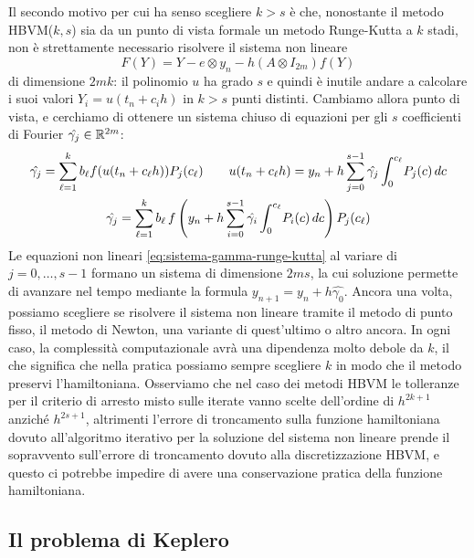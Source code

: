 Il secondo motivo per cui ha senso scegliere $k > s$ è che, nonostante
il metodo HBVM($k,s$) sia da un punto di vista formale un metodo Runge-Kutta
a $k$ stadi, non è strettamente necessario risolvere il sistema non lineare
\[
F(Y) = Y - e \otimes y_n - h(A \otimes I_{2m}) f(Y)
\]
di dimensione $2mk$: il polinomio $u$ ha grado $s$ e quindi è inutile andare
a calcolare i suoi valori $Y_i = u(t_n + c_i h)$ in $k > s$ punti distinti.
Cambiamo allora punto di vista, e cerchiamo di ottenere un sistema chiuso
di equazioni per gli $s$ coefficienti di Fourier $\hat{\gamma_j} \in \mathbb{R}^{2m}$:
\begin{gather}
\hat{\gamma_j}
= \sum_{\ell=1}^k b_\ell f(u(t_n + c_\ell h)) P_j(c_\ell)
\qquad u(t_n + c_\ell h)
= y_n + h \sum_{j=0}^{s-1} \hat{\gamma_j} \int_0^{c_\ell} \! P_j(c) \, dc \\
\label{eq:sistema-gamma-runge-kutta}
\hat{\gamma_j}
= \sum_{\ell=1}^k b_\ell \, f \left(
	y_n + h \sum_{i=0}^{s-1} \hat{\gamma_i} \int_0^{c_\ell} \! P_i(c) \, dc
	\right) P_j(c_\ell)
\end{gather}
Le equazioni non lineari \eqref{eq:sistema-gamma-runge-kutta} al variare
di $j = 0,\dots,s-1$ formano un sistema di dimensione $2ms$,
la cui soluzione permette di avanzare nel tempo mediante la formula
$y_{n+1} = y_n + h \hat{\gamma_0}$. Ancora una volta, possiamo scegliere
se risolvere il sistema non lineare tramite il metodo di punto fisso,
il metodo di Newton, una variante di quest'ultimo o altro ancora.
In ogni caso, la complessità computazionale avrà una dipendenza molto
debole da $k$, il che significa che nella pratica possiamo sempre scegliere
$k$ in modo che il metodo preservi l'hamiltoniana.
Osserviamo che nel caso dei metodi HBVM le tolleranze per il criterio
di arresto misto sulle iterate vanno scelte dell'ordine di $h^{2k+1}$
anziché $h^{2s+1}$, altrimenti l'errore di troncamento sulla funzione
hamiltoniana dovuto all'algoritmo iterativo per la soluzione del
sistema non lineare prende il sopravvento sull'errore di troncamento
dovuto alla discretizzazione HBVM, e questo ci potrebbe impedire di avere
una conservazione pratica della funzione hamiltoniana.

\subsection*{Il problema di Keplero}

